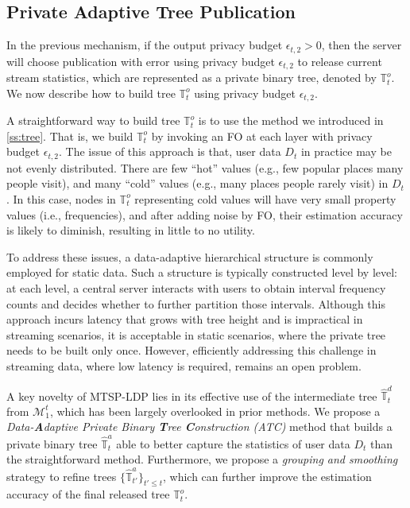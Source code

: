 \documentclass[acmsmall]{acmart}
\newcommand{\Tree}{\mathbb{T}}
\newcommand{\CM}{\mathcal{M}}
\newcommand{\hDT}{\hat{\Tree}^d}
\newcommand{\hAT}{\hat{\Tree}^a}
\newcommand{\OT}{\Tree^o}
\begin{document}
\subsection{Private Adaptive Tree Publication}
\label{ss:tree_publication}

In the previous mechanism, if the output privacy budget $\epsilon_{t,2}>0$, then
the server will choose publication with error using privacy budget
$\epsilon_{t,2}$ to release current stream statistics, which are represented as
a private binary tree, denoted by $\OT_t$.
We now describe how to build tree $\OT_t$ using privacy budget $\epsilon_{t,2}$.

A straightforward way to build tree $\OT_t$ is to use the method we introduced
in \cref{ss:tree}.
That is, we build $\OT_t$ by invoking an FO at each layer with privacy budget $\epsilon_{t,2}$.
The issue of this approach is that, user data $D_t$ in practice may be not
evenly distributed.
There are few ``hot'' values (e.g., few popular places many people visit), and
many ``cold'' values (e.g., many places people rarely visit) in $D_t$.
In this case, nodes in $\OT_t$ representing cold values will have very small
property values (i.e., frequencies), and after adding noise by FO, their
estimation accuracy is likely to diminish, resulting in little to no utility.

To address these issues, a data-adaptive hierarchical structure is commonly employed for static data. Such a structure is typically constructed level by level: at each level, a central server interacts with users to obtain interval frequency counts and decides whether to further partition those intervals. Although this approach incurs latency that grows with tree height and is impractical in streaming scenarios, it is acceptable in static scenarios, where the private tree needs to be built only once. However, efficiently addressing this challenge in streaming data, where low latency is required, remains an open problem.

A key novelty of MTSP-LDP lies in its effective use of the intermediate tree $\hDT_t$ from $\CM_1^t$, which has been largely overlooked in prior methods.
We propose a \emph{Data-\textbf{A}daptive Private Binary
  \textbf{T}ree \textbf{C}onstruction (ATC)} method that builds a private binary
tree $\hAT_t$ able to better capture the statistics of user data $D_t$ than the
straightforward method.
Furthermore, we propose a \emph{grouping and smoothing} strategy to refine trees
$\{\hAT_{t'}\}_{t'\leq t}$, which can further improve the estimation accuracy of
the final released tree $\OT_t$.
\end{document}
